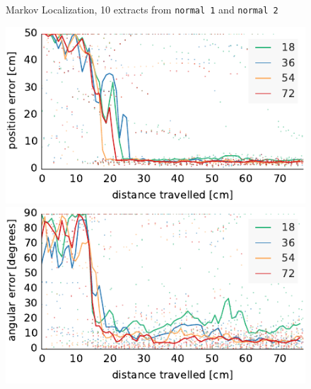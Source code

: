 \documentclass[letterpaper, 10pt, conference]{ieeeconf}
\begin{document}
\begin{figure}

\begin{center}
Markov Localization, 10 extracts from \texttt{normal 1} and \texttt{normal 2}
\end{center}
\includegraphics{ml-small_runs_random_12-xy}\hfill
\includegraphics{ml-small_runs_random_12-theta}

\vspace{.5em}


\end{figure}
\end{document}
